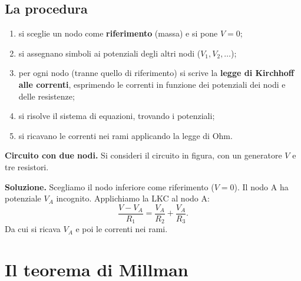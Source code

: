 \subsection{La procedura}

\begin{enumerate}[leftmargin=1cm]
  \item si sceglie un nodo come \textbf{riferimento} (massa) e si pone \(V = 0\);
  \item si assegnano simboli ai potenziali degli altri nodi (\(V_1, V_2, \dots\));
  \item per ogni nodo (tranne quello di riferimento) si scrive la \textbf{legge di Kirchhoff alle correnti}, esprimendo le correnti in funzione dei potenziali dei nodi e delle resistenze;
  \item si risolve il sistema di equazioni, trovando i potenziali;
  \item si ricavano le correnti nei rami applicando la legge di Ohm.
\end{enumerate}

\begin{esempio}
\textbf{Circuito con due nodi.} Si consideri il circuito in figura, con un generatore \(V\) e tre resistori.

\begin{center}
\end{center}

\textbf{Soluzione.} Scegliamo il nodo inferiore come riferimento (\(V = 0\)). Il nodo A ha potenziale \(V_A\) incognito. Applichiamo la LKC al nodo A:
\[
\frac{V - V_A}{R_1} = \frac{V_A}{R_2} + \frac{V_A}{R_3}.
\]
Da cui si ricava \(V_A\) e poi le correnti nei rami.
\end{esempio}

\section{Il teorema di Millman}

